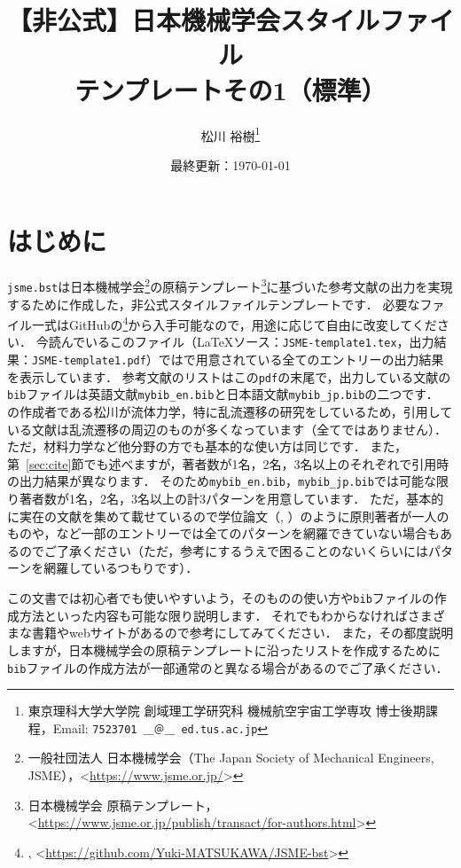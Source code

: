 \documentclass[a4paper,fleqn,uplatex,dvipdfmx]{jsarticle}
\title{【非公式】日本機械学会\BibTeX{}スタイルファイル \\ \JSMErepos テンプレートその1（標準）}
\author{松川 裕樹\thanks{東京理科大学大学院 創域理工学研究科 機械航空宇宙工学専攻 博士後期課程，Email: \texttt{7523701 ＿＠＿ ed.tus.ac.jp}}}
\date{最終更新：\today}
\newcommand{\jsmefile}{\texttt{jsme.bst}}
\begin{document}
\maketitle
\thispagestyle{cover}

\vspace{-5mm}
\tableofcontents

\section{はじめに}
\label{sec:introduction}
\jsmefile は日本機械学会\footnote{一般社団法人 日本機械学会（The Japan Society of Mechanical Engineers, JSME），\textless\url{https://www.jsme.or.jp/}\textgreater}の原稿テンプレート\footnote{日本機械学会 原稿テンプレート，\textless\url{https://www.jsme.or.jp/publish/transact/for-authors.html}\textgreater}に基づいた参考文献の出力を実現するために作成した，非公式\BibTeX{}スタイルファイルテンプレートです．
必要なファイル一式はGitHubの\JSMErepos\footnote{\JSMErepos, \textless\url{https://github.com/Yuki-MATSUKAWA/JSME-bst}\textgreater}から入手可能なので，用途に応じて自由に改変してください．
今読んでいるこのファイル（\LaTeX{}ソース：\verb|JSME-template1.tex|，出力結果：\verb|JSME-template1.pdf|）では\BibTeX{}で用意されている全てのエントリーの出力結果を表示しています．
参考文献のリストはこの\verb|pdf|の末尾で，出力している文献の\verb|bib|ファイルは英語文献\verb|mybib_en.bib|と日本語文献\verb|mybib_jp.bib|の二つです．
\JSMErepos の作成者である松川が流体力学，特に乱流遷移の研究をしているため，引用している文献は乱流遷移の周辺のものが多くなっています（全てではありません）．
ただ，材料力学など他分野の方でも基本的な使い方は同じです．
また，第~\ref{sec:cite}節でも述べますが，著者数が1名，2名，3名以上のそれぞれで引用時の出力結果が異なります．
そのため\verb|mybib_en.bib|，\verb|mybib_jp.bib|では可能な限り著者数が1名，2名，3名以上の計3パターンを用意しています．
ただ，基本的に実在の文献を集めて載せているので学位論文（\hyperref[ssec:phdthesis]{\ttphdthesis}, \hyperref[ssec:mastersthesis]{\ttmastersthesis}）のように原則著者が一人のものや\hyperref[ssec:manual]{\ttmanual}，\hyperref[ssec:unpublished]{\ttunpublished}など一部のエントリーでは全てのパターンを網羅できていない場合もあるのでご了承ください（ただ，参考にするうえで困ることのないくらいにはパターンを網羅しているつもりです）．

この文書では\BibTeX{}初心者でも使いやすいよう，\BibTeX{}そのものの使い方や\verb|bib|ファイルの作成方法といった内容も可能な限り説明します．
それでもわからなければさまざまな書籍やwebサイトがあるので参考にしてみてください．
また，その都度説明しますが，日本機械学会の原稿テンプレートに沿ったリストを作成するために\verb|bib|ファイルの作成方法が一部通常の\BibTeX{}と異なる場合があるのでご了承ください．
\end{document}
